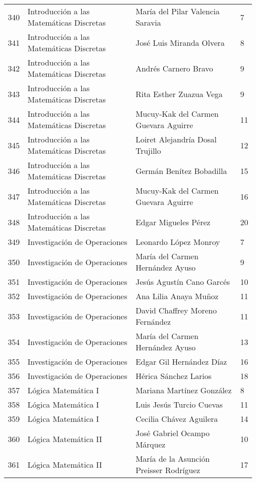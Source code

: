 \begin{table}[ht]
\begin{tabular}{rlll}
  340 & Introducción a las Matemáticas Discretas & María del Pilar Valencia Saravia & 7 \\ 
  341 & Introducción a las Matemáticas Discretas & José Luis Miranda Olvera & 8 \\ 
  342 & Introducción a las Matemáticas Discretas & Andrés Carnero Bravo & 9 \\ 
  343 & Introducción a las Matemáticas Discretas & Rita Esther Zuazua Vega & 9 \\ 
  344 & Introducción a las Matemáticas Discretas & Mucuy-Kak del Carmen Guevara Aguirre & 11 \\ 
  345 & Introducción a las Matemáticas Discretas & Loiret Alejandría Dosal Trujillo & 12 \\ 
  346 & Introducción a las Matemáticas Discretas & Germán Benítez Bobadilla & 15 \\ 
  347 & Introducción a las Matemáticas Discretas & Mucuy-Kak del Carmen Guevara Aguirre & 16 \\ 
  348 & Introducción a las Matemáticas Discretas & Edgar Migueles Pérez & 20 \\ 
  349 & Investigación de Operaciones & Leonardo López Monroy & 7 \\ 
  350 & Investigación de Operaciones & María del Carmen Hernández Ayuso & 9 \\ 
  351 & Investigación de Operaciones & Jesús Agustín Cano Garcés & 10 \\ 
  352 & Investigación de Operaciones & Ana Lilia Anaya Muñoz & 11 \\ 
  353 & Investigación de Operaciones & David Chaffrey Moreno Fernández & 11 \\ 
  354 & Investigación de Operaciones & María del Carmen Hernández Ayuso & 13 \\ 
  355 & Investigación de Operaciones & Edgar Gil Hernández Díaz & 16 \\ 
  356 & Investigación de Operaciones & Hérica Sánchez Larios & 18 \\ 
  357 & Lógica Matemática I & Mariana Martínez González & 8 \\ 
  358 & Lógica Matemática I & Luis Jesús Turcio Cuevas & 11 \\ 
  359 & Lógica Matemática I & Cecilia Chávez Aguilera & 14 \\ 
  360 & Lógica Matemática II & José Gabriel Ocampo Márquez & 10 \\ 
  361 & Lógica Matemática II & María de la Asunción Preisser Rodríguez & 17 \\ 

\end{tabular}
\end{table}
